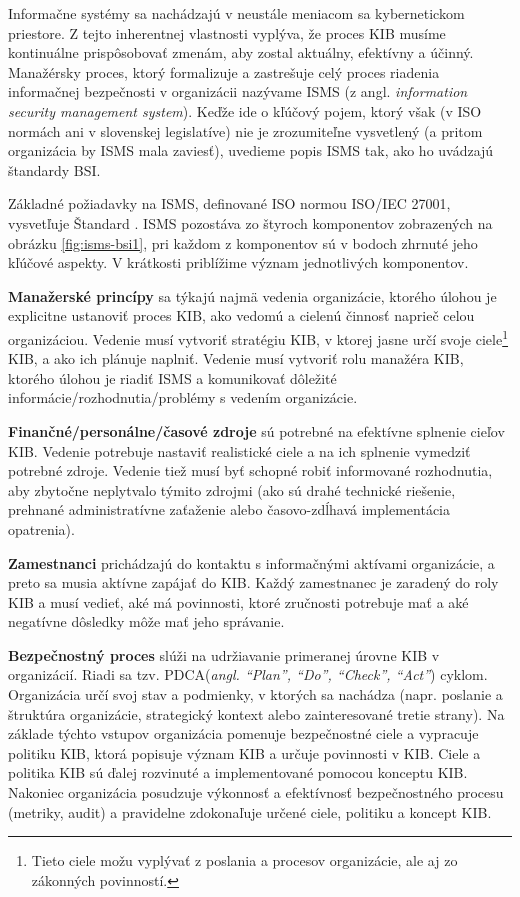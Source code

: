 Informačne systémy sa nachádzajú v neustále meniacom sa kybernetickom priestore. Z tejto inherentnej vlastnosti vyplýva, že proces
KIB musíme kontinuálne prispôsobovať zmenám, aby zostal aktuálny, efektívny a účinný. Manažérsky proces, ktorý formalizuje
a zastrešuje celý proces riadenia informačnej bezpečnosti v organizácii nazývame ISMS (z angl. \emph{information security
management system}). Keďže ide o kľúčový pojem, ktorý však (v ISO normách ani v slovenskej legislatíve) nie je zrozumiteľne
vysvetlený (a pritom organizácia by ISMS mala zaviesť), uvedieme popis ISMS tak, ako ho uvádzajú štandardy BSI.

Základné požiadavky na ISMS, definované ISO normou ISO/IEC 27001, vysvetľuje  Štandard \cite{BSI1}. ISMS pozostáva zo štyroch
komponentov zobrazených na obrázku \ref{fig:isms-bsi1}, pri každom z komponentov sú v bodoch zhrnuté jeho kľúčové aspekty. 
V krátkosti priblížime význam jednotlivých komponentov. 



\textbf{Manažerské princípy} sa týkajú najmä vedenia organizácie, ktorého úlohou je explicitne ustanoviť proces KIB, ako vedomú
a cielenú činnosť naprieč celou organizáciou. Vedenie musí vytvoriť stratégiu KIB, v ktorej jasne určí svoje
ciele\footnote{Tieto ciele možu vyplývať z poslania a procesov organizácie, ale aj zo zákonných povinností.} KIB, a ako ich
plánuje naplniť. Vedenie musí vytvoriť rolu manažéra KIB, ktorého úlohou je riadiť ISMS a komunikovať dôležité
informácie/rozhodnutia/problémy s vedením organizácie.

\textbf{Finančné/personálne/časové zdroje} sú potrebné na efektívne splnenie cieľov KIB. Vedenie potrebuje
nastaviť realistické ciele a na ich splnenie vymedziť potrebné zdroje. Vedenie tiež musí byť schopné robiť informované rozhodnutia,
aby zbytočne neplytvalo týmito zdrojmi (ako sú drahé technické riešenie, prehnané administratívne zaťaženie
alebo časovo-zdĺhavá implementácia opatrenia).

\textbf{Zamestnanci} prichádzajú do kontaktu s informačnými aktívami organizácie, a preto sa musia aktívne zapájať do KIB. Každý zamestnanec je
zaradený do roly KIB a musí vedieť, aké má povinnosti, ktoré zručnosti potrebuje mať a aké negatívne dôsledky môže mať
jeho správanie.

\textbf{Bezpečnostný proces} slúži na udržiavanie primeranej úrovne KIB v organizácií. Riadi sa tzv.
PDCA(\emph{angl. “Plan”, “Do”, “Check”, “Act”}) cyklom. Organizácia určí svoj stav a podmienky,
v ktorých sa nachádza (napr. poslanie a štruktúra organizácie, strategický kontext alebo zainteresované
tretie strany). Na základe týchto vstupov organizácia pomenuje bezpečnostné ciele a vypracuje politiku KIB, ktorá popisuje
význam KIB a určuje povinnosti v KIB. Ciele a politika KIB sú ďalej rozvinuté a implementované pomocou konceptu KIB.
Nakoniec organizácia posudzuje výkonnosť a efektívnosť bezpečnostného procesu (metriky, audit) a pravidelne zdokonaľuje určené
ciele, politiku a koncept KIB.

